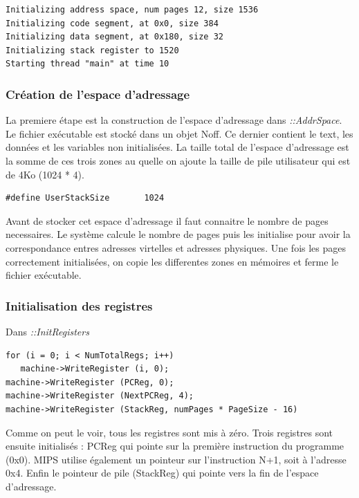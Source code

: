\documentclass[a4paper,10pt]{article}
\begin{document}
\begin{lstlisting}
Initializing address space, num pages 12, size 1536
Initializing code segment, at 0x0, size 384
Initializing data segment, at 0x180, size 32
Initializing stack register to 1520
Starting thread "main" at time 10
\end{lstlisting}

\subsubsection{Création de l'espace d'adressage}

La premiere étape est la construction de l'espace d'adressage dans
\textit{::AddrSpace}. Le fichier exécutable est stocké dans un objet Noff. Ce
dernier contient le text, les données et les variables non initialisées. La
taille total de l'espace d'adressage est la somme de ces trois zones au quelle
on ajoute la taille de pile utilisateur qui est de 4Ko (1024 * 4).

\begin{lstlisting}
#define UserStackSize		1024
\end{lstlisting}

Avant de stocker cet espace d'adressage il faut connaitre le nombre de pages
necessaires. Le système calcule le nombre de pages puis les initialise pour
avoir la correspondance entres adresses virtelles et adresses physiques. Une
fois les pages correctement initialisées, on copie les differentes zones en
mémoires et ferme le fichier exécutable.

\subsubsection{Initialisation des registres}

Dans \textit{::InitRegisters} 
\begin{lstlisting}
for (i = 0; i < NumTotalRegs; i++)
   machine->WriteRegister (i, 0);
machine->WriteRegister (PCReg, 0);
machine->WriteRegister (NextPCReg, 4);
machine->WriteRegister (StackReg, numPages * PageSize - 16)
\end{lstlisting}

Comme on peut le voir, tous les registres sont mis à zéro. Trois
registres sont ensuite initialisés : PCReg qui pointe sur la première
instruction du programme (0x0). MIPS utilise également un pointeur sur
l'instruction N+1, soit à l'adresse 0x4. Enfin le pointeur de pile (StackReg)
qui pointe vers la fin de l'espace d'adressage.
\end{document}
